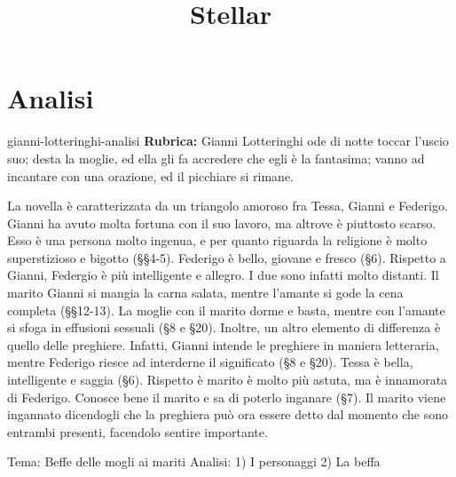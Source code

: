 \documentclass[preview]{standalone}
\begin{document}
\title{Stellar}
\genpage

\section{Analisi}

\begin{snippet}{gianni-lotteringhi-analisi}
    \textbf{Rubrica:} Gianni Lotteringhi ode di notte toccar l'uscio suo; desta la moglie, ed ella gli fa accredere che egli è la fantasima; vanno ad incantare con una orazione, ed il picchiare si rimane.

    
    La novella è caratterizzata da un triangolo amoroso fra Tessa, Gianni e Federigo.
    Gianni ha avuto molta fortuna con il suo lavoro, ma altrove è piuttosto scarso.
    Esso è una persona molto ingenua, e per quanto riguarda la religione è molto
    superstizioso e bigotto (§§4-5).
    Federigo è bello, giovane e fresco (§6).
    Rispetto a Gianni, Federgio è più intelligente e allegro.
    I due sono infatti molto distanti.
    Il marito Gianni si mangia la carna salata, mentre l'amante si gode la cena completa (§§12-13).
    La moglie con il marito dorme e basta, mentre con l'amante si sfoga in effusioni sessuali (§8 e §20).
    Inoltre, un altro elemento di differenza è quello delle preghiere. Infatti, Gianni intende le preghiere in maniera letteraria,
    mentre Federigo riesce ad interderne il significato (§8 e §20).
    Tessa è bella, intelligente e saggia (§6). Rispetto è marito è molto più astuta, ma è innamorata di Federigo.
    Conosce bene il marito e sa di poterlo inganare (§7).
    Il marito viene ingannato dicendogli che la preghiera può ora essere detto dal momento che sono
    entrambi presenti, facendolo sentire importante.
    
    
\end{snippet}


Tema: Beffe delle mogli ai mariti 
Analisi: 
	1) I personaggi
	2) La beffa
\end{document}
